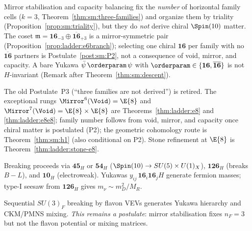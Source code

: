 \begin{proposition}
\label{prop:sm:p2-nogo}
Mirror stabilisation and capacity balancing fix the \emph{number} of
horizontal family cells ($k=3$, Theorem~\ref{thm:sm:three-families}) and
organize them by triality (Proposition~\ref{prop:sm:triality}), but they do
\emph{not} derive chiral $\Spin(10)$ matter. The coset
$\mathfrak{m}=\mathbf{16}_{-3}\oplus\overline{\mathbf{16}}_{+3}$ is a
mirror-symmetric pair (Proposition~\ref{prop:ladder:e6branch}); selecting
one chiral $\mathbf{16}$ per family with no $\overline{\mathbf{16}}$
partners is Postulate~\ref{post:sm:P2}, not a consequence of void, mirror,
and capacity. A bare Yukawa $\bar\psi\,\orderparam\,\psi$ with
$\orderparam\in\{\mathbf{16},\overline{\mathbf{16}}\}$ is not
$H$-invariant (Remark after Theorem~\ref{thm:sm:descent}).
\end{proposition}

\begin{remark}\label{rem:sm:P3status}
The old Postulate~P3 (``three families are not derived'') is retired.
The exceptional rungs $\Mirror^6(\Void)=\E{8}$ and
$\Mirror^7(\Void)=\E{8}\times\E{8}$ are Theorems~\ref{thm:ladder:e8} and
\ref{thm:ladder:e8e8}; family number follows from void, mirror, and capacity
once chiral matter is postulated (P2); the geometric cohomology route is
Theorem~\ref{thm:sm:h1} (also conditional on P2). Stone refinement at $\E{8}$ is
Theorem~\ref{thm:ladder:stone-e8}.
\end{remark}

\begin{postulate}\label{post:sm:P4}
Breaking proceeds via $\mathbf{45}_H$ or $\mathbf{54}_H$
($\Spin(10)\to SU(5)\times U(1)_X$), $\mathbf{126}_H$ (breaks $B-L$), and
$\mathbf{10}_H$ (electroweak). Yukawas $y_{ij}\,\mathbf{16}_i\mathbf{16}_j H$
generate fermion masses; type-I seesaw from $\mathbf{126}_H$ gives
$m_\nu\sim m_D^2/M_R$.
\end{postulate}

\begin{postulate}\label{post:sm:flavons}
Sequential $SU(3)_F$ breaking by flavon VEVs generates Yukawa hierarchy and
CKM/PMNS mixing. \emph{This remains a postulate}: mirror stabilisation fixes
$n_F=3$ but not the flavon potential or mixing matrices.
\end{postulate}


